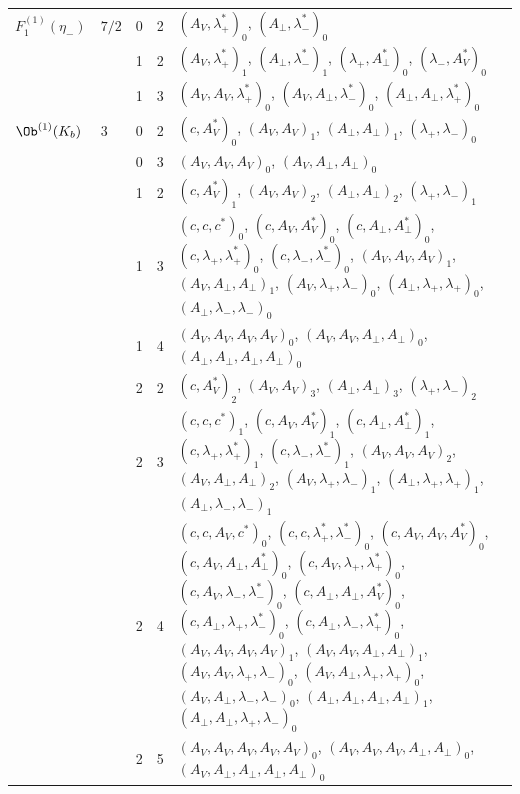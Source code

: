 {\begin{longtable}{>{\raggedright}p{2.3cm}|p{0.6cm}|p{0.25cm}|p{0.25cm}|>{\raggedright\arraybackslash}p{11.6cm}}
\hline
$F_1^{(1)}(\eta_-)$ & $7/2$ & 0 & 2 & $(A_V,\lambda^*_+)_{0}$, $(A_\perp,\lambda^*_-)_{0}$ \\
 &  & 1 & 2 & $(A_V,\lambda^*_+)_{1}$, $(A_\perp,\lambda^*_-)_{1}$, $(\lambda_+,A^*_\perp)_{0}$, $(\lambda_-,A^*_V)_{0}$ \\
 &  & 1 & 3 & $(A_V,A_V,\lambda^*_+)_{0}$, $(A_V,A_\perp,\lambda^*_-)_{0}$, $(A_\perp,A_\perp,\lambda^*_+)_{0}$ \\
\hline
$\Ob^{(1)}(K_b)$ & $3$ & 0 & 2 & $(c,A^*_V)_{0}$, $(A_V,A_V)_{1}$, $(A_\perp,A_\perp)_{1}$, $(\lambda_+,\lambda_-)_{0}$ \\
 &  & 0 & 3 & $(A_V,A_V,A_V)_{0}$, $(A_V,A_\perp,A_\perp)_{0}$ \\
 &  & 1 & 2 & $(c,A^*_V)_{1}$, $(A_V,A_V)_{2}$, $(A_\perp,A_\perp)_{2}$, $(\lambda_+,\lambda_-)_{1}$ \\
 &  & 1 & 3 & $(c,c,c^*)_{0}$, $(c,A_V,A^*_V)_{0}$, $(c,A_\perp,A^*_\perp)_{0}$, $(c,\lambda_+,\lambda^*_+)_{0}$, $(c,\lambda_-,\lambda^*_-)_{0}$, $(A_V,A_V,A_V)_{1}$, $(A_V,A_\perp,A_\perp)_{1}$, $(A_V,\lambda_+,\lambda_-)_{0}$, $(A_\perp,\lambda_+,\lambda_+)_{0}$, $(A_\perp,\lambda_-,\lambda_-)_{0}$ \\
 &  & 1 & 4 & $(A_V,A_V,A_V,A_V)_{0}$, $(A_V,A_V,A_\perp,A_\perp)_{0}$, $(A_\perp,A_\perp,A_\perp,A_\perp)_{0}$ \\
 &  & 2 & 2 & $(c,A^*_V)_{2}$, $(A_V,A_V)_{3}$, $(A_\perp,A_\perp)_{3}$, $(\lambda_+,\lambda_-)_{2}$ \\
 &  & 2 & 3 & $(c,c,c^*)_{1}$, $(c,A_V,A^*_V)_{1}$, $(c,A_\perp,A^*_\perp)_{1}$, $(c,\lambda_+,\lambda^*_+)_{1}$, $(c,\lambda_-,\lambda^*_-)_{1}$, $(A_V,A_V,A_V)_{2}$, $(A_V,A_\perp,A_\perp)_{2}$, $(A_V,\lambda_+,\lambda_-)_{1}$, $(A_\perp,\lambda_+,\lambda_+)_{1}$, $(A_\perp,\lambda_-,\lambda_-)_{1}$ \\
 &  & 2 & 4 & $(c,c,A_V,c^*)_{0}$, $(c,c,\lambda^*_+,\lambda^*_-)_{0}$, $(c,A_V,A_V,A^*_V)_{0}$, $(c,A_V,A_\perp,A^*_\perp)_{0}$, $(c,A_V,\lambda_+,\lambda^*_+)_{0}$, $(c,A_V,\lambda_-,\lambda^*_-)_{0}$, $(c,A_\perp,A_\perp,A^*_V)_{0}$, $(c,A_\perp,\lambda_+,\lambda^*_-)_{0}$, $(c,A_\perp,\lambda_-,\lambda^*_+)_{0}$, $(A_V,A_V,A_V,A_V)_{1}$, $(A_V,A_V,A_\perp,A_\perp)_{1}$, $(A_V,A_V,\lambda_+,\lambda_-)_{0}$, $(A_V,A_\perp,\lambda_+,\lambda_+)_{0}$, $(A_V,A_\perp,\lambda_-,\lambda_-)_{0}$, $(A_\perp,A_\perp,A_\perp,A_\perp)_{1}$, $(A_\perp,A_\perp,\lambda_+,\lambda_-)_{0}$ \\
 &  & 2 & 5 & $(A_V,A_V,A_V,A_V,A_V)_{0}$, $(A_V,A_V,A_V,A_\perp,A_\perp)_{0}$, $(A_V,A_\perp,A_\perp,A_\perp,A_\perp)_{0}$ \\

\end{longtable}}
